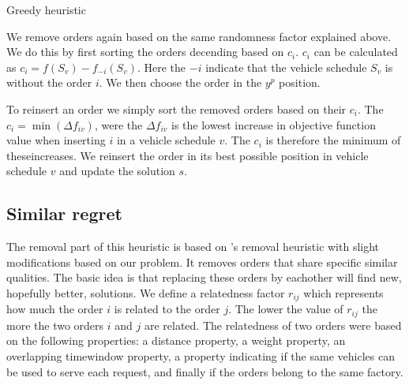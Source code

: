 \documentclass[../main.tex]{subfiles}
\begin{document}
\begin{algorithm}
    \caption{Greedy heuristic}\label{alg:greedy}
    \begin{algorithmic}[1]
        $, $p$}
        \State select the number of orders to reinsert $q$
        \State add orders in array $A$ based on decending cost $f(S_v) - f_{-i}(S_v)$
        \State empty order set $I$
        \Repeat
            \State choose a random number $y$ between $[0,1]$
            \State remove the order in position $y^p$ in $A$ from $s$ 
            \State add removed order to $I$
        \Until {$|I| = q$}
        \Repeat
            \State sort $I$ based on each orders minimum increase in objective value $c_i$
            \State insert the first order $i$ from $I$ in its best possible position in $s$
            \State remove order $i$ from $I$
        \Until{$|I| = 0$}
        \State
        \Return $s$
        \EndFunction
    \end{algorithmic}
\end{algorithm}

We remove orders again based on the same randomness factor explained above. 
We do this by first sorting the orders decending based on $c_i$. $c_i$ can be calculated as $c_i=f(S_v) - f_{-i}(S_v)$. 
Here the $-i$ indicate that the vehicle schedule $S_v$ is without the order $i$.
We then choose the order in the $y^p$ position. \par

To reinsert an order we simply sort the removed orders based on their $c_i$.
The $c_i = \min(\Delta f_{iv})$, were the $\Delta f_{iv}$ is the lowest increase in objective function value when inserting $i$ in a vehicle schedule $v$. The $c_i$ is therefore the minimum of theseincreases. 
We reinsert the order in its best possible position in vehicle schedule $v$ and update the solution $s$. 

\subsection{Similar regret}
\label{sec:shaw}
The removal part of this heuristic is based on \citet{shaw97}'s removal heuristic with slight modifications based on our problem. 
It removes orders that share specific similar qualities. 
The basic idea is that replacing these orders by eachother will find new, hopefully better, solutions. 
We define a relatedness factor $r_{ij}$ which represents how much the order $i$ is related to the order $j$. 
The lower the value of $r_{ij}$ the more the two orders $i$ and $j$ are related.
The relatedness of two orders were based on the following properties: 
a distance property, a weight property, an overlapping timewindow property, a property indicating if the same vehicles can be used to serve each request, and finally if the orders belong to the same factory.
\end{document}
